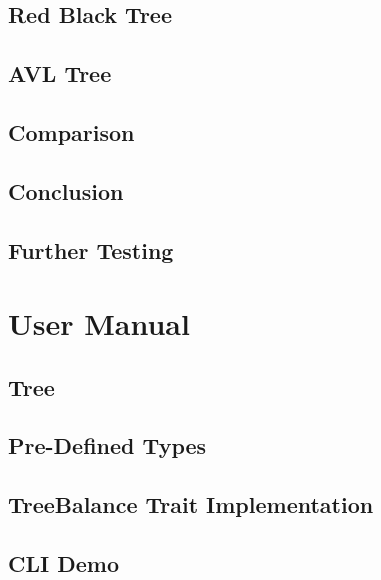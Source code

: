 \documentclass[12pt, letterpaper]{article}
\begin{document}
\subsection{Red Black Tree}

\subsection{AVL Tree}

\subsection{Comparison}

\subsection{Conclusion}

\subsection{Further Testing}

\section{User Manual}

\subsection{Tree}

\subsection{Pre-Defined Types}

\subsection{TreeBalance Trait Implementation}

\subsection{CLI Demo}
\end{document}
